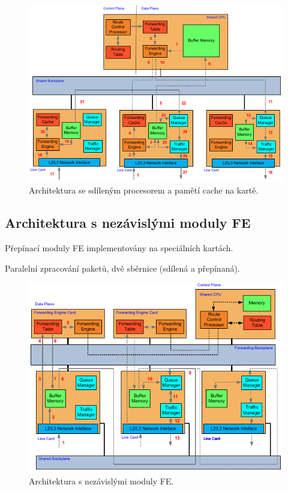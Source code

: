 \begin{figure}[H]
    \centering
    \includegraphics[width=0.95\linewidth]{architektura_se_sdilenym_procesorem_a_pameti_cache_na_karte.pdf}
    \caption{Architektura se sdíleným procesorem a pamětí cache na kartě.}
\end{figure}

\subsection{Architektura s nezávislými moduly FE}

\begin{compactitem}
    \item Přepínací moduly FE implementovány na speciálních kartách.
    \item Paralelní zpracování paketů, dvě sběrnice (sdílená a přepínaná).
\end{compactitem}

\begin{figure}[H]
    \centering
    \includegraphics[width=0.95\linewidth]{architektura_s_nezavislymi_moduly_fe.pdf}
    \caption{Architektura s nezávislými moduly FE.}
\end{figure}

